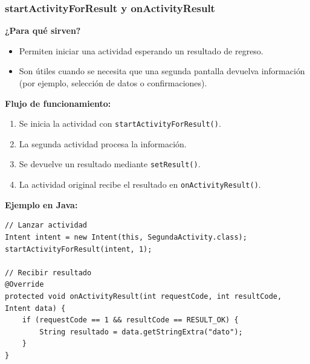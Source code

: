\begin{frame}[fragile]
\frametitle{startActivityForResult y onActivityResult}  
\textbf{¿Para qué sirven?}

\begin{itemize}
    \item Permiten iniciar una actividad esperando un resultado de regreso.
    \item Son útiles cuando se necesita que una segunda pantalla devuelva información (por ejemplo, selección de datos o confirmaciones).
\end{itemize}

\vspace{0.4cm}

\textbf{Flujo de funcionamiento:}
\begin{enumerate}
    \item Se inicia la actividad con \texttt{startActivityForResult()}.
    \item La segunda actividad procesa la información.
    \item Se devuelve un resultado mediante \texttt{setResult()}.
    \item La actividad original recibe el resultado en \texttt{onActivityResult()}.
\end{enumerate}


\textbf{Ejemplo en Java:}
\begin{block}{}
\small
\begin{verbatim}
// Lanzar actividad
Intent intent = new Intent(this, SegundaActivity.class);
startActivityForResult(intent, 1);

// Recibir resultado
@Override
protected void onActivityResult(int requestCode, int resultCode, Intent data) {
    if (requestCode == 1 && resultCode == RESULT_OK) {
        String resultado = data.getStringExtra("dato");
    }
}
\end{verbatim}
\end{block}

\end{frame}




